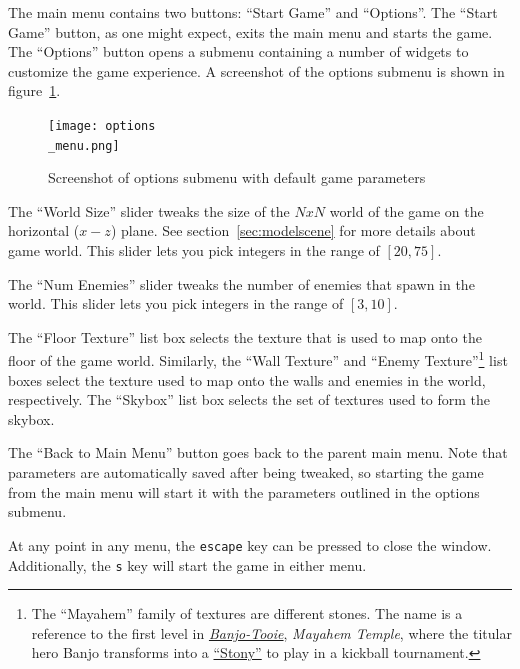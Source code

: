 \documentclass {article}
\begin{document}
The main menu contains two buttons: ``Start Game'' and ``Options''. The ``Start Game'' button, as one might expect, exits the main menu and starts the game. The ``Options'' button opens a submenu containing a number of widgets to customize the game experience. A screenshot of the options submenu is shown in figure~\ref{fig:optionsmenu}.
\begin{figure}[H]
  \begin{center}
  \texttt{[image: options\\\_menu.png]}
  \end{center}
  \caption{Screenshot of options submenu with default game parameters}\label{fig:optionsmenu}
\end{figure}

The ``World Size'' slider tweaks the size of the $N x N$ world of the game on the horizontal ($x-z$) plane. See section~\ref{sec:modelscene} for more details about game world. This slider lets you pick integers in the range of $[20, 75]$.

The ``Num Enemies'' slider tweaks the number of enemies that spawn in the world. This slider lets you pick integers in the range of $[3, 10]$.

The ``Floor Texture'' list box selects the texture that is used to map onto the floor of the game world. Similarly, the ``Wall Texture'' and ``Enemy Texture''\footnote{The ``Mayahem'' family of textures are different stones. The name is a reference to the first level in \href{https://en.wikipedia.org/wiki/Banjo-Tooie}{\textit{Banjo-Tooie}}, \textit{Mayahem Temple}, where the titular hero Banjo transforms into a \href{https://banjokazooie.fandom.com/wiki/Stony_Banjo}{``Stony''} to play in a kickball tournament.} list boxes select the texture used to map onto the walls and enemies in the world, respectively. The ``Skybox'' list box selects the set of textures used to form the skybox.

The ``Back to Main Menu'' button goes back to the parent main menu. Note that parameters are automatically saved after being tweaked, so starting the game from the main menu will start it with the parameters outlined in the options submenu.

At any point in any menu, the \texttt{escape} key can be pressed to close the window. Additionally, the \texttt{s} key will start the game in either menu.
\end{document}
